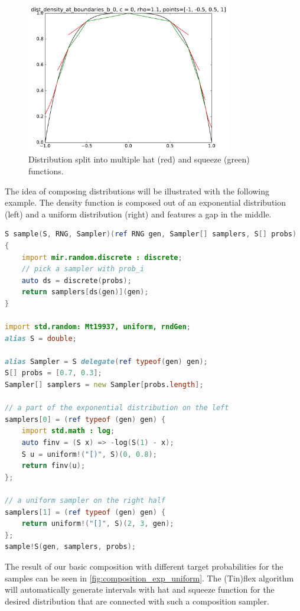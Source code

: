\documentclass[]{article}
\begin{document}
\begin{figure}[h!]
\centering
\includegraphics[width=0.8\textwidth]{figs/dist_density_at_boundaries_b_0_hs.pdf}
\caption{Distribution split into multiple hat (red) and squeeze (green) functions.}
\label{fig:dist_composition}
\end{figure}

The idea of composing distributions will be illustrated with the following example. The density function is composed out of an exponential distribution (left) and a uniform distribution (right) and features a gap in the middle.

\begin{lstlisting}[language=D]
S sample(S, RNG, Sampler)(ref RNG gen, Sampler[] samplers, S[] probs)
{
    import mir.random.discrete : discrete;
    // pick a sampler with prob_i
    auto ds = discrete(probs);
    return samplers[ds(gen)](gen);
}

import std.random: Mt19937, uniform, rndGen;
alias S = double;

alias Sampler = S delegate(ref typeof(gen) gen);
S[] probs = [0.7, 0.3];
Sampler[] samplers = new Sampler[probs.length];

// a part of the exponential distribution on the left
samplers[0] = (ref typeof (gen) gen) {
    import std.math : log;
    auto finv = (S x) => -log(S(1) - x);
    S u = uniform!("[)", S)(0, 0.8);
    return finv(u);
};

// a uniform sampler on the right half
samplers[1] = (ref typeof (gen) gen) {
    return uniform!("[]", S)(2, 3, gen);
};
sample!S(gen, samplers, probs);
\end{lstlisting}

The result of our basic composition with different target probabilities for the samples can be seen in \autoref{fig:composition_exp_uniform}. The (Tin)flex algorithm will automatically generate intervals with hat and squeeze function for the desired distribution that are connected with such a composition sampler.
\end{document}
